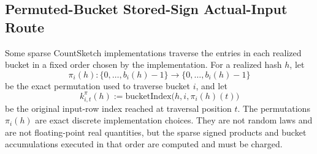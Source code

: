 \documentclass[11pt]{article}
\theoremstyle{remark}
\begin{document}
\subsection*{Permuted-Bucket Stored-Sign Actual-Input Route}

Some sparse CountSketch implementations traverse the entries in each realized
bucket in a fixed order chosen by the implementation.  For a realized hash
\(h\), let
\[
  \pi_i(h):\{0,\ldots,b_i(h)-1\}\to\{0,\ldots,b_i(h)-1\}
\]
be the exact permutation used to traverse bucket \(i\), and let
\[
  k_{i,t}^{\pi}(h)
  :=
  \mathrm{bucketIndex}\bigl(h,i,\pi_i(h)(t)\bigr)
\]
be the original input-row index reached at traversal position \(t\).  The
permutations \(\pi_i(h)\) are exact discrete implementation choices.  They are
not random laws and are not floating-point real quantities, but the sparse
signed products and bucket accumulations executed in that order are computed
and must be charged.
\end{document}
